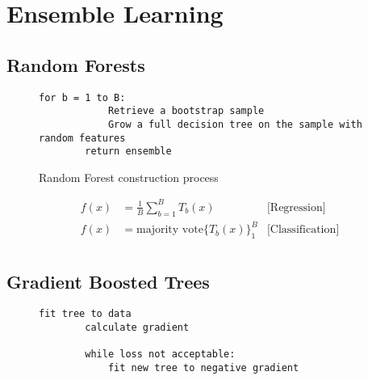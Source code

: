 \section{Ensemble Learning}

\subsection{Random Forests}

\begin{figure}[h]
    \begin{lstlisting}[gobble=8]
        for b = 1 to B:
            Retrieve a bootstrap sample
            Grow a full decision tree on the sample with random features
        return ensemble 
    \end{lstlisting}
    \caption{Random Forest construction process}
\end{figure}

\begin{align*}
    f(x) &= \frac{1}{B}\sum^{B}_{b=1} T_b(x) & \text{[Regression]}\\
    f(x) &= \text{majority vote} \{T_b(x)\}^{B}_{1} & \text{[Classification]}\\
\end{align*}

\subsection{Gradient Boosted Trees}
\begin{figure}[h]
    \begin{lstlisting}[gobble=8]
        fit tree to data
        calculate gradient

        while loss not acceptable:
            fit new tree to negative gradient
    \end{lstlisting}
\end{figure}
